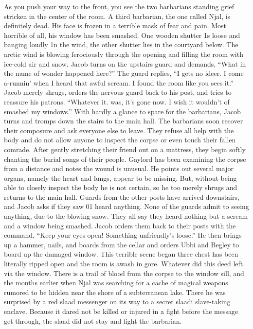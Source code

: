 \documentclass[a5paper,11pt,twoside]{book}
\begin{document}
{As you push your way to the front, you see the two barbarians standing grief stricken in the center of the room.
A third barbarian, the one called Njal, is definitely dead.
His face is frozen in a terrible mask of fear and pain.
Most horrible of all, his  window has been smashed.
One wooden shutter 1s loose and banging loudly 1n the wind, the other shutter lies in the courtyard below.
The arctic wind is blowing ferociously through the opening and filling the room with ice-cold air and snow.
Jacob turns on the upstairs guard and demands, “What in the name of wonder happened here?” The guard replies, “I gets no ideer.
I come a-runnin’ when I heard that awful scream.
I found the room like you sees it.” Jacob merely shrugs, orders the nervous guard back to his post, and tries to reassure his patrons.
“Whatever it.
was, it’s gone now.
I wish it wouldn’t of smashed my windows.” With hardly a glance to spare for the barbarians, Jacob turns and tromps down the stairs to the main hall.
The barbarians soon recover their composure and ask everyone else to leave.
They refuse all help with the body and do not allow anyone to inspect the corpse or even touch their fallen comrade.
After gently stretching their friend out on a mattress, they begin softly chanting the burial songs of their people.
Gaylord has been examining the corpse from a distance and notes the wound is unusual.
He points out several major organs, namely the heart and lungs, appear to be missing.
But, without being able to closely inspect the body he is not certain, so he too merely shrugs and returns to the main hall.
Guards from the other posts have arrived downstairs, and Jacob asks if they saw 01 heard anything.
None of the guards admit to seeing anything, due to the blowing snow.
They all say they heard nothing but a scream and a window being smashed.
Jacob orders them back to their posts with the command, “Keep your eyes open! Something unfriendly’s loose.” He then brings up a hammer, nails, and boards from the cellar and orders Ubbi and Begley to board up the damaged window.
This terrible scene began three  chest has been literally ripped open and the room is awash in gore.
Whatever did this deed left via the window.
There is a trail of blood from the corpse to the window sill, and the  months earlier when Njal was searching for a cache of magical weapons rumored to be hidden near the shore of a subterranean lake.
There he was surprised by a red slaad messenger on its way to a secret slaadi slave-taking  enclave.
Because it dared not be killed or injured in a fight before the message get through, the slaad did not stay and fight the barbarian.
}
\end{document}
